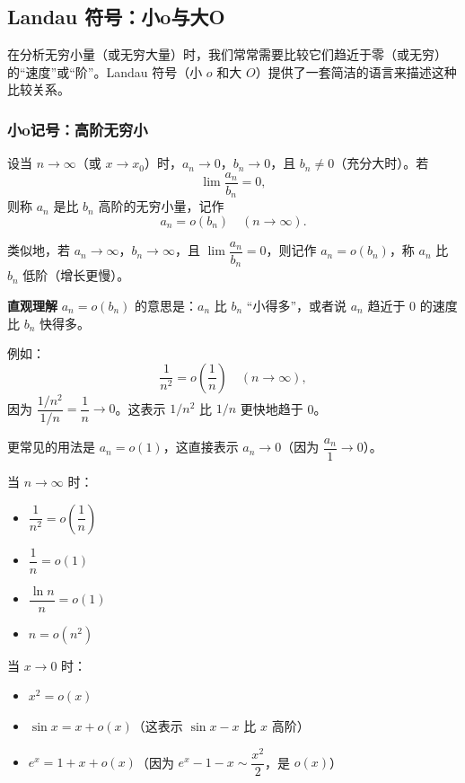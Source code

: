 \documentclass[fontset=fandol]{ctexart}
\newenvironment{custom}[1]{\par\noindent\textbf{#1}\quad}{\par\vspace{0.8em}}
\begin{document}
\subsection{Landau 符号：小o与大O}

在分析无穷小量（或无穷大量）时，我们常常需要比较它们趋近于零（或无穷）的“速度”或“阶”。Landau 符号（小 \(o\) 和大 \(O\)）提供了一套简洁的语言来描述这种比较关系。

\subsubsection{小o记号：高阶无穷小}

\begin{definition}[小o记号]
设当 \(n \to \infty\)（或 \(x \to x_0\)）时，\(a_n \to 0\)，\(b_n \to 0\)，且 \(b_n \neq 0\)（充分大时）。若
\[
\lim \dfrac{a_n}{b_n} = 0,
\]
则称 \(a_n\) 是比 \(b_n\) 高阶的无穷小量，记作
\[
a_n = o(b_n) \quad (n \to \infty).
\]

类似地，若 \(a_n \to \infty\)，\(b_n \to \infty\)，且 \(\lim \dfrac{a_n}{b_n} = 0\)，则记作 \(a_n = o(b_n)\)，称 \(a_n\) 比 \(b_n\) 低阶（增长更慢）。
\end{definition}

\begin{custom}{直观理解}
\(a_n = o(b_n)\) 的意思是：\(a_n\) 比 \(b_n\) “小得多”，或者说 \(a_n\) 趋近于 0 的速度比 \(b_n\) 快得多。

例如：
\[
\dfrac{1}{n^2} = o\left(\dfrac{1}{n}\right) \quad (n \to \infty),
\]
因为 \(\dfrac{1/n^2}{1/n} = \dfrac{1}{n} \to 0\)。这表示 \(1/n^2\) 比 \(1/n\) 更快地趋于 0。

更常见的用法是 \(a_n = o(1)\)，这直接表示 \(a_n \to 0\)（因为 \(\dfrac{a_n}{1} \to 0\)）。
\end{custom}

\begin{example}[小o记号的例子]
当 \(n \to \infty\) 时：
\begin{itemize}
\item \(\dfrac{1}{n^2} = o\left(\dfrac{1}{n}\right)\)
\item \(\dfrac{1}{n} = o(1)\)
\item \(\dfrac{\ln n}{n} = o(1)\)
\item \(n = o(n^2)\)
\end{itemize}

当 \(x \to 0\) 时：
\begin{itemize}
\item \(x^2 = o(x)\)
\item \(\sin x = x + o(x)\)（这表示 \(\sin x - x\) 比 \(x\) 高阶）
\item \(e^x = 1 + x + o(x)\)（因为 \(e^x - 1 - x \sim \dfrac{x^2}{2}\)，是 \(o(x)\)）
\end{itemize}
\end{example}
\end{document}
